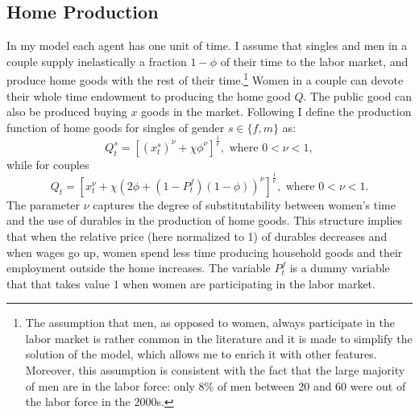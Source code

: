 \documentclass[12pt]{article}
\begin{document}
 \subsection{Home Production}
 In my model each agent has one unit of time. I assume that singles and men in a couple supply inelastically a fraction $1-\phi$ of their time to the labor market, and produce home goods with the rest of their time.\footnote{The assumption that men, as opposed to women, always participate in the labor market is rather common in the literature \citep{ciscato2019,low2018,voena2015,reynoso2019} and it is made to simplify the solution of the model, which allows me to enrich it with other features. Moreover, this assumption is consistent with the fact that the large majority of men are in the labor force: only 8\% of men between 20 and 60 were out of the labor force in the 2000s.} Women in a couple can devote their whole time endowment to producing the home good $Q$. The public good can also be produced buying $x$ goods in the market. Following \cite{greenwood2016} I define the production function of home goods for singles of gender $s\in\{f,m\}$ as:
 \begin{equation}\label{eq:pfunctions}
 Q^s_t=[(x^s_t)^\nu+\chi {\phi}^\nu]^{\frac{1}{\nu}}, \text{ where }0<\nu<1,
 \end{equation}
 while for couples
 \begin{equation}\label{eq:pfunctionc}
 Q_t=[x_t^\nu+\chi {(2\phi+(1-P^f_t)(1-\phi))}^\nu]^{\frac{1}{\nu}}, \text{ where }0<\nu<1.
 \end{equation}
 The parameter $\nu$ captures the degree of substitutability between women's time and the use of durables in the production of home goods. This structure implies that when the relative price (here normalized to 1) of durables decreases and when wages go up, women spend less time producing household goods and their employment outside the home increases. The variable  $P^f_t$ is a dummy variable that that takes value $1$ when women are participating in the labor market.
\end{document}
